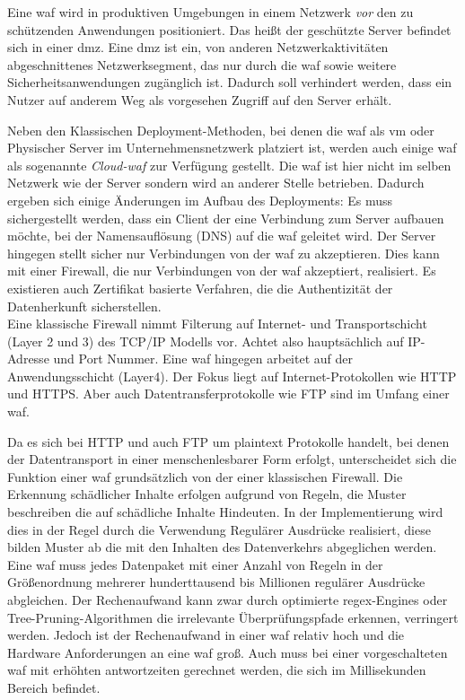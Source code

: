 Eine \ac{waf} wird in produktiven Umgebungen in einem Netzwerk \textit{vor} den zu schützenden Anwendungen positioniert.
Das heißt der geschützte Server befindet sich in einer \ac{dmz}.
Eine \ac{dmz} ist ein, von anderen Netzwerkaktivitäten abgeschnittenes Netzwerksegment, das nur durch die \ac{waf} sowie weitere Sicherheitsanwendungen zugänglich ist.
Dadurch soll verhindert werden, dass ein Nutzer auf anderem Weg als vorgesehen Zugriff auf den Server erhält.

Neben den Klassischen Deployment-Methoden, bei denen die \ac{waf} als \ac{vm} oder Physischer Server im Unternehmensnetzwerk platziert ist, werden auch einige \ac{waf} als sogenannte \textit{Cloud-\ac{waf}} zur Verfügung gestellt.
Die \ac{waf} ist hier nicht im selben Netzwerk wie der Server sondern wird an anderer Stelle betrieben.
Dadurch ergeben sich einige Änderungen im Aufbau des Deployments:
Es muss sichergestellt werden, dass ein Client der eine Verbindung zum Server aufbauen möchte, bei der Namensauflösung (DNS) auf die \ac{waf} geleitet wird.
Der Server hingegen stellt sicher nur Verbindungen von der \ac{waf} zu akzeptieren.
Dies kann mit einer Firewall, die nur Verbindungen von der \ac{waf} akzeptiert, realisiert.
Es existieren auch Zertifikat basierte Verfahren, die die Authentizität der Datenherkunft sicherstellen.\\

Eine klassische Firewall nimmt Filterung auf Internet- und Transportschicht (Layer 2 und 3) des TCP/IP Modells vor.
Achtet also hauptsächlich auf IP-Adresse und Port Nummer.
Eine \ac{waf} hingegen arbeitet auf der Anwendungsschicht (Layer4).
Der Fokus liegt auf Internet-Protokollen wie HTTP und HTTPS. 
Aber auch Datentransferprotokolle wie FTP sind im Umfang einer \ac{waf}.

Da es sich bei HTTP und auch FTP um plaintext Protokolle handelt, bei denen der Datentransport in einer menschenlesbarer Form erfolgt, unterscheidet sich die Funktion einer \ac{waf} grundsätzlich von der einer klassischen Firewall.
Die Erkennung schädlicher Inhalte erfolgen aufgrund von Regeln, die Muster beschreiben die auf schädliche Inhalte Hindeuten.
In der Implementierung wird dies in der Regel durch die Verwendung Regulärer Ausdrücke realisiert, diese bilden Muster ab die mit den Inhalten des Datenverkehrs abgeglichen werden.
Eine \ac{waf} muss jedes Datenpaket mit einer Anzahl von Regeln in der Größenordnung mehrerer hunderttausend bis Millionen regulärer Ausdrücke abgleichen.
Der Rechenaufwand kann zwar durch optimierte regex-Engines oder Tree-Pruning-Algorithmen die irrelevante Überprüfungspfade erkennen, verringert werden.
Jedoch ist der Rechenaufwand in einer \ac{waf} relativ hoch und die Hardware Anforderungen an eine \ac{waf} groß.
Auch muss bei einer vorgeschalteten \ac{waf} mit erhöhten antwortzeiten gerechnet werden, die sich im Millisekunden Bereich befindet.

